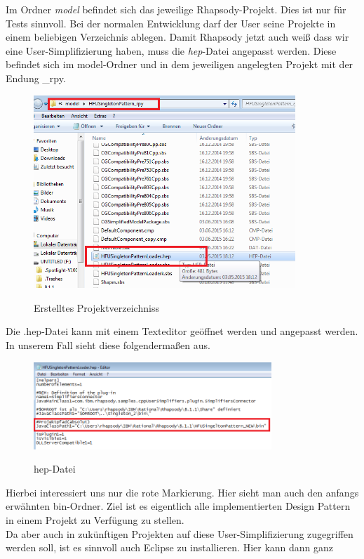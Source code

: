 Im Ordner \textit{model} befindet sich das jeweilige Rhapsody-Projekt. Dies ist nur für
Tests sinnvoll. Bei der normalen Entwicklung darf der User seine Projekte in
einem beliebigen Verzeichnis ablegen. Damit Rhapsody jetzt auch weiß dass wir
eine User-Simplifizierung haben, muss die \textit{hep}-Datei angepasst werden. Diese befindet sich im model-Ordner und in dem jeweiligen angelegten
Projekt mit der Endung _rpy.
\begin{figure}[H]
	\centering
	\includegraphics[width=0.88\textwidth]{content/pictures/install/model.png}
	\label{pic:bild}
	\caption{Erstelltes Projektverzeichniss}
\end{figure}
Die .hep-Datei kann mit einem Texteditor geöffnet werden und angepasst werden.
In unserem Fall sieht diese folgendermaßen aus.
\begin{figure}[H]
	\centering
	\includegraphics[width=0.8\textwidth]{content/pictures/install/hep.png}
	\label{pic:bild}
	\caption{hep-Datei}
\end{figure}
Hierbei interessiert uns nur die rote Markierung. Hier sieht man auch den
anfangs erwähnten bin-Ordner. Ziel ist es eigentlich alle implementierten
Design Pattern in einem Projekt zu Verfügung zu stellen.\\
Da aber auch in zukünftigen Projekten auf diese User-Simplifizierung zugegriffen
werden soll, ist es sinnvoll auch Eclipse zu installieren. Hier kann dann ganz
